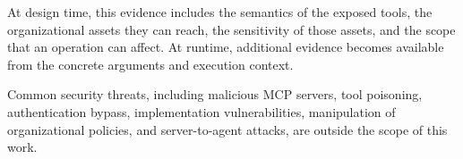\documentclass[sigconf]{acmart}
\begin{document}


At design time, this evidence includes the semantics of the exposed tools, the organizational assets they can reach, the sensitivity of those assets, and the scope that an operation can affect. At runtime, additional evidence becomes available from the concrete arguments and execution context.

Common security threats, including malicious MCP servers, tool poisoning, authentication bypass, implementation vulnerabilities, manipulation of organizational policies, and server-to-agent attacks, are outside the scope of this work.


\end{document}
